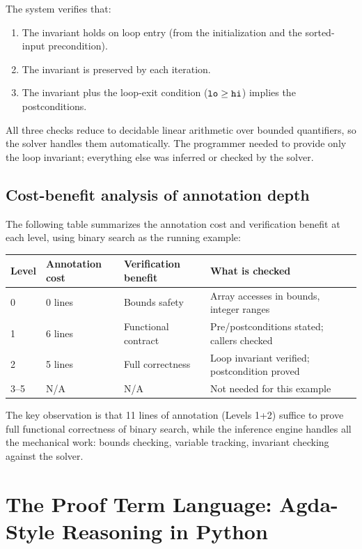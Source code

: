 \documentclass[11pt]{report}
\DeclareRobustCommand{\py}[1]{\texttt{\detokenize{#1}}}
\theoremstyle{definition}
\theoremstyle{plain}
\begin{document}
The system verifies that:
\begin{enumerate}[nosep]
  \item The invariant holds on loop entry (from the initialization and
        the sorted-input precondition).
  \item The invariant is preserved by each iteration.
  \item The invariant plus the loop-exit condition ($\py{lo} \geq \py{hi}$)
        implies the postconditions.
\end{enumerate}

All three checks reduce to decidable linear arithmetic over bounded
quantifiers, so the solver handles them automatically. The programmer needed
to provide only the loop invariant; everything else was inferred or checked
by the solver.

\section{Cost-benefit analysis of annotation depth}

The following table summarizes the annotation cost and verification benefit
at each level, using binary search as the running example:

\begin{center}
\begin{tabular}{lllp{5cm}}
\toprule
\textbf{Level} & \textbf{Annotation cost} & \textbf{Verification benefit} &
  \textbf{What is checked} \\
\midrule
0 & 0 lines & Bounds safety & Array accesses in bounds, integer ranges \\
1 & 6 lines & Functional contract & Pre/postconditions stated; callers checked \\
2 & 5 lines & Full correctness & Loop invariant verified; postcondition proved \\
3--5 & N/A & N/A & Not needed for this example \\
\bottomrule
\end{tabular}
\end{center}

The key observation is that 11 lines of annotation (Levels 1+2) suffice to
prove full functional correctness of binary search, while the inference
engine handles all the mechanical work: bounds checking, variable tracking,
invariant checking against the solver.

\chapter{The Proof Term Language: Agda-Style Reasoning in Python}
\end{document}
